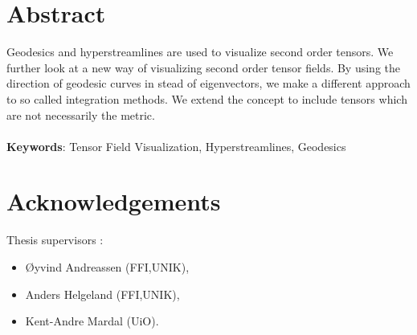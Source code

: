 \documentclass[main.tex]{subfiles}
\begin{document}
\section*{Abstract}      
Geodesics and hyperstreamlines are used to visualize second order tensors. 
We further look at a new way of visualizing second order tensor fields. By using 
the direction of geodesic curves in stead of eigenvectors, we make a different approach 
to so called integration methods. We extend the concept to include tensors which are not 
necessarily the metric.
\\\\
\hspace{-7mm}\textbf{Keywords}: Tensor Field Visualization, Hyperstreamlines, Geodesics       

\newpage\null

\section*{Acknowledgements}

Thesis supervisors :
\begin{itemize}
\item \O yvind Andreassen (FFI,UNIK),
\item Anders Helgeland (FFI,UNIK),
\item Kent-Andre Mardal (UiO).
\end{itemize}
\end{document}
